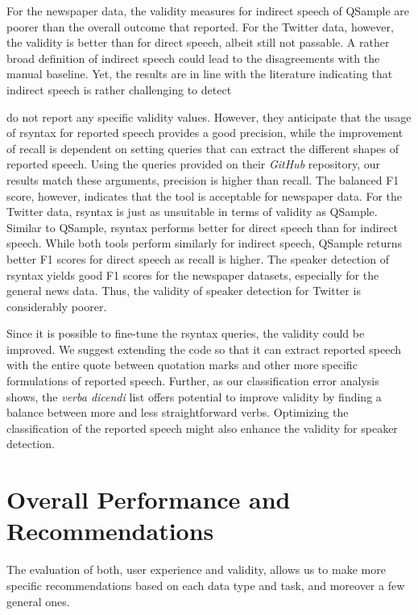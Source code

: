 \documentclass{ccr}
\begin{document}
For the newspaper data, the validity measures for indirect speech of
QSample are poorer than the overall outcome that \textcite{scheible2016model}
reported. For the Twitter data, however, the validity is better than for
direct speech, albeit still not passable. A rather broad definition of
indirect speech could lead to the disagreements with the manual
baseline. Yet, the results are in line with the literature indicating
that indirect speech is rather challenging to detect \textcite{pareti2013automatically}

\textcite{welbers2021extracting} do not report any specific validity values.
However, they anticipate that the usage of rsyntax for reported speech
provides a good precision, while the improvement of recall is dependent
on setting queries that can extract the different shapes of reported
speech. Using the queries provided on their \textit{GitHub} repository,
our results match these arguments, precision is higher than recall. The
balanced F1 score, however, indicates that the tool is acceptable for
newspaper data. For the Twitter data, rsyntax is just as unsuitable in
terms of validity as QSample. Similar to QSample, rsyntax performs
better for direct speech than for indirect speech. While both tools
perform similarly for indirect speech, QSample returns better F1 scores
for direct speech as recall is higher. The speaker detection of rsyntax
yields good F1 scores for the newspaper datasets, especially for the
general news data. Thus, the validity of speaker detection for Twitter
is considerably poorer.

Since it is possible to fine-tune the rsyntax queries, the validity
could be improved. We suggest extending the code so that it can extract
reported speech with the entire quote between quotation marks and other
more specific formulations of reported speech. Further, as our
classification error analysis shows, the \textit{verba dicendi} list
offers potential to improve validity by finding a balance between more
and less straightforward verbs. Optimizing the classification of the
reported speech might also enhance the validity for speaker detection.

\section{Overall Performance and Recommendations}The evaluation of both, user experience and validity, allows us to make
more specific recommendations based on each data type and task, and
moreover a few general ones.
\end{document}

